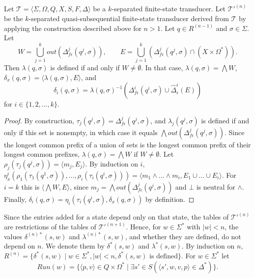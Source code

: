 \begin{proposition}\label{prop:quasisubseq_delta}
  Let $\mathcal{T} = \langle \Sigma, \Omega, Q, X, S, F, \Delta \rangle$ be a
  $k$-separated finite-state transducer. Let $\mathcal{T}'^{(n)}$ be the
  $k$-separated quasi-subsequential finite-state transducer derived from
  $\mathcal{T}$ by applying the construction described above for $n > 1$. Let $q \in
  R^{(n-1)}$ and $\sigma \in \Sigma$. Let
  \begin{equation*}
    W = \bigcup_{j=1}^k out(\Delta_{f\epsilon}^j(q^j, \sigma)), \qquad E =
    \bigcup_{j=1}^k (\Delta_{f\epsilon}^j(q^j, \sigma) \cap (X \times \Omega^*)).
  \end{equation*}
  Then $\lambda(q, \sigma)$ is defined if and only if $W \neq \emptyset$. In that
  case, $\lambda(q, \sigma) = \bigwedge W$, $\delta_x(q, \sigma) = \langle \lambda(q,
  \sigma), E \rangle$, and
  \begin{equation*}
    \delta_i(q, \sigma) = \lambda(q, \sigma)^{-1}(\Delta_{f\epsilon}^i(q^i, \sigma)
    \cup \hat{\Delta}_\epsilon^i(E))
  \end{equation*}
  for $i \in \{ 1, 2, \ldots, k \}$.
\end{proposition}

\begin{proof}
  By construction, $\tau_j(q^j, \sigma) = \Delta_{f\epsilon}^j(q^j, \sigma)$, and
  $\lambda_j(q^j, \sigma)$ is defined if and only if this set is nonempty, in which
  case it equals $\bigwedge out(\Delta_{f\epsilon}^j(q^j, \sigma))$. Since the longest
  common prefix of a union of sets is the longest common prefix of their longest
  common prefixes, $\lambda(q, \sigma) = \bigwedge W$ if $W \neq \emptyset$. Let
  $\rho_j(\tau_j(q^j, \sigma)) = \langle m_j, E_j \rangle$. By induction on $i$,
  $\eta_x^i(\rho_1(\tau_1(q^1, \sigma)), \ldots, \rho_i(\tau_i(q^i, \sigma))) =
  \langle m_1 \wedge \ldots \wedge m_i, E_1 \cup \ldots \cup E_i \rangle$. For $i = k$
  this is $\langle \bigwedge W, E \rangle$, since $m_j = \bigwedge
  out(\Delta_{f\epsilon}^j(q^j, \sigma))$ and $\bot$ is neutral for $\wedge$.
  Finally, $\delta_i(q, \sigma) = \eta_i(\tau_i(q^i, \sigma), \delta_x(q, \sigma))$
  by definition.
\end{proof}

Since the entries added for a state depend only on that state, the tables of
$\mathcal{T}'^{(n)}$ are restrictions of the tables of $\mathcal{T}'^{(n+1)}$. Hence,
for $w \in \Sigma^*$ with $|w| < n$, the values $\delta^{(n)*}(s, w)$ and
$\lambda^{(n)*}(s, w)$, and whether they are defined, do not depend on $n$. We denote
them by $\delta^*(s, w)$ and $\lambda^*(s, w)$. By induction on $n$, $R^{(n)} = \{
\delta^*(s, w) \mid w \in \Sigma^*, |w| < n, \delta^*(s, w) \textrm{ is defined} \}$.
For $w \in \Sigma^*$ let
\begin{equation*}
  Run(w) = \{ \langle p, v \rangle \in Q \times \Omega^* \mid \exists s' \in S
  (\langle s', w, v, p \rangle \in \Delta^*) \}.
\end{equation*}

